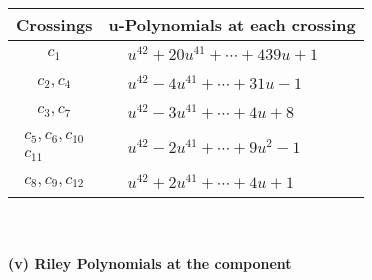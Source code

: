 \documentclass[1p]{elsarticle_modified}
\theoremstyle{definition}
\begin{document}
\begin{tabular}{m{50pt}|m{274pt}}
Crossings & \hspace{64pt}u-Polynomials at each crossing \\
\hline $$\begin{aligned}c_{1}\end{aligned}$$&$\begin{aligned}
&u^{42}+20 u^{41}+\cdots+439 u+1
\end{aligned}$\\
\hline $$\begin{aligned}c_{2},c_{4}\end{aligned}$$&$\begin{aligned}
&u^{42}-4 u^{41}+\cdots+31 u-1
\end{aligned}$\\
\hline $$\begin{aligned}c_{3},c_{7}\end{aligned}$$&$\begin{aligned}
&u^{42}-3 u^{41}+\cdots+4 u+8
\end{aligned}$\\
\hline $$\begin{aligned}c_{5},c_{6},c_{10}\\c_{11}\end{aligned}$$&$\begin{aligned}
&u^{42}-2 u^{41}+\cdots+9 u^2-1
\end{aligned}$\\
\hline $$\begin{aligned}c_{8},c_{9},c_{12}\end{aligned}$$&$\begin{aligned}
&u^{42}+2 u^{41}+\cdots+4 u+1
\end{aligned}$\\
\hline
\end{tabular}\\~\\
\newpage\renewcommand{\arraystretch}{1}
\flushleft \textbf{(v) Riley Polynomials at the component}\newline \\
\end{document}
